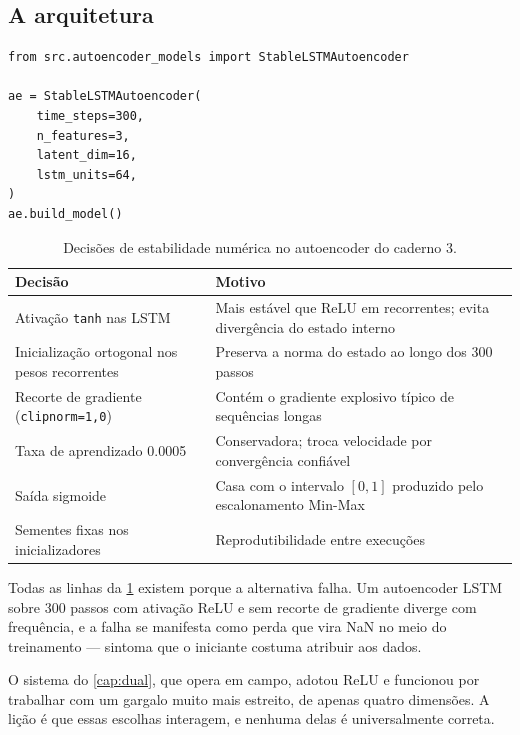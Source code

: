 \subsection{A arquitetura}

\begin{lstlisting}
from src.autoencoder_models import StableLSTMAutoencoder

ae = StableLSTMAutoencoder(
    time_steps=300,
    n_features=3,
    latent_dim=16,
    lstm_units=64,
)
ae.build_model()
\end{lstlisting}

\begin{table}[htbp]
\centering
\caption{Decisões de estabilidade numérica no autoencoder do caderno 3.}
\label{tab:pratica-ae}
\small
\begin{tabular}{p{4.0cm}p{8.0cm}}
\toprule
\textbf{Decisão} & \textbf{Motivo} \\
\midrule
Ativação \texttt{tanh} nas LSTM & Mais estável que ReLU em recorrentes; evita
divergência do estado interno \\
\addlinespace
Inicialização ortogonal nos pesos recorrentes & Preserva a norma do estado ao longo dos
300 passos \\
\addlinespace
Recorte de gradiente (\texttt{clipnorm=1{,}0}) & Contém o gradiente explosivo típico de
sequências longas \\
\addlinespace
Taxa de aprendizado \num{0.0005} & Conservadora; troca velocidade por convergência
confiável \\
\addlinespace
Saída sigmoide & Casa com o intervalo $[0,1]$ produzido pelo escalonamento Min-Max \\
\addlinespace
Sementes fixas nos inicializadores & Reprodutibilidade entre execuções \\
\bottomrule
\end{tabular}
\end{table}

\begin{destaque}
Todas as linhas da \cref{tab:pratica-ae} existem porque a alternativa falha. Um
autoencoder LSTM sobre 300 passos com ativação ReLU e sem recorte de gradiente diverge
com frequência, e a falha se manifesta como perda que vira NaN no meio do treinamento ---
sintoma que o iniciante costuma atribuir aos dados.

O sistema do \cref{cap:dual}, que opera em campo, adotou ReLU e funcionou por trabalhar
com um gargalo muito mais estreito, de apenas quatro dimensões. A lição é que essas
escolhas interagem, e nenhuma delas é universalmente correta.
\end{destaque}

